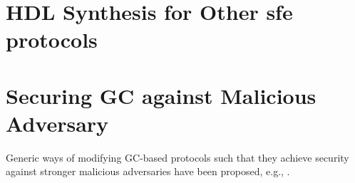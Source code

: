 \section{HDL Synthesis for Other \acrshort{sfe} protocols}

\section{Securing GC against Malicious Adversary}
Generic ways of modifying GC-based protocols such that they achieve security against stronger malicious adversaries have been proposed, e.g., \cite{lindell2007efficient, lindell2012secure, nielsen2009lego}.
